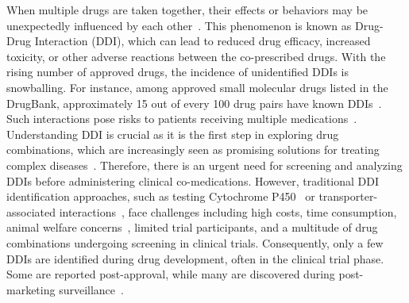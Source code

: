 \documentclass[unnumsec,webpdf,contemporary,large]{oup-authoring-template}%
\theoremstyle{thmstyleone}%
\theoremstyle{thmstyletwo}%
\theoremstyle{thmstylethree}%
\begin{document}
When multiple drugs are taken together, their effects or behaviors may be unexpectedly influenced by each other~\cite{Wienkers2005}. This phenomenon is known as Drug-Drug Interaction (DDI), which can lead to reduced drug efficacy, increased toxicity, or other adverse reactions between the co-prescribed drugs. With the rising number of approved drugs, the incidence of unidentified DDIs is snowballing. For instance, among approved small molecular drugs listed in the DrugBank, approximately 15 out of every 100 drug pairs have known DDIs~\cite{Law2014}. Such interactions pose risks to patients receiving multiple medications~\cite{Leape1995, PMID:28232141, Mulroy2017}. Understanding DDI is crucial as it is the first step in exploring drug combinations, which are increasingly seen as promising solutions for treating complex diseases~\cite{PMID:22219721}. Therefore, there is an urgent need for screening and analyzing DDIs before administering clinical co-medications. However, traditional DDI identification approaches, such as testing Cytochrome P450~\cite{Veith2009} or transporter-associated interactions~\cite{Huang2007}, face challenges including high costs, time consumption, animal welfare concerns~\cite{Zhang2015}, limited trial participants, and a multitude of drug combinations undergoing screening in clinical trials. Consequently, only a few DDIs are identified during drug development, often in the clinical trial phase. Some are reported post-approval, while many are discovered during post-marketing surveillance~\cite{Karim2019}.
\end{document}
